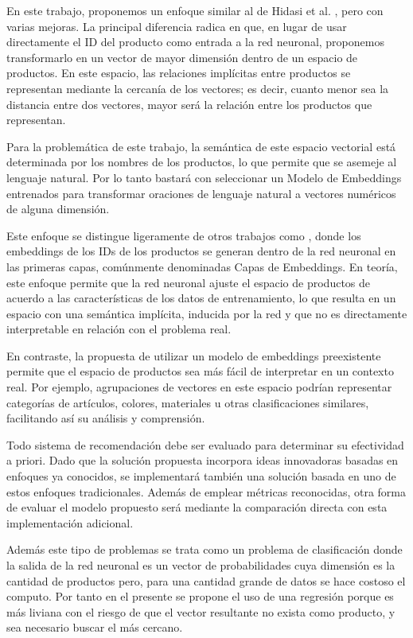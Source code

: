 \documentclass[runningheads]{llncs}
\begin{document}
En este trabajo, proponemos un enfoque similar al de Hidasi et al. \cite{hidasi2016session}, pero con varias mejoras. La principal diferencia radica en que, en lugar de usar directamente el ID del producto como entrada a la red neuronal, proponemos transformarlo en un vector de mayor dimensión dentro de un espacio de productos. En este espacio, las relaciones implícitas entre productos se representan mediante la cercanía de los vectores; es decir, cuanto menor sea la distancia entre dos vectores, mayor será la relación entre los productos que representan.

Para la problemática de este trabajo, la semántica de este espacio vectorial está determinada por los nombres de los productos, lo que permite que se asemeje al lenguaje natural. Por lo tanto bastará con seleccionar un Modelo de Embeddings entrenados para transformar oraciones de lenguaje natural a vectores numéricos de alguna dimensión.

Este enfoque se distingue ligeramente de otros trabajos como \cite{chung2014empirical,tang2018personalized}, donde los embeddings de los IDs de los productos se generan dentro de la red neuronal en las primeras capas, comúnmente denominadas Capas de Embeddings. En teoría, este enfoque permite que la red neuronal ajuste el espacio de productos de acuerdo a las características de los datos de entrenamiento, lo que resulta en un espacio con una semántica implícita, inducida por la red y que no es directamente interpretable en relación con el problema real.

En contraste, la propuesta de utilizar un modelo de embeddings preexistente permite que el espacio de productos sea más fácil de interpretar en un contexto real. Por ejemplo, agrupaciones de vectores en este espacio podrían representar categorías de artículos, colores, materiales u otras clasificaciones similares, facilitando así su análisis y comprensión.

Todo sistema de recomendación debe ser evaluado para determinar su efectividad a priori. Dado que la solución propuesta incorpora ideas innovadoras basadas en enfoques ya conocidos, se implementará también una solución basada en uno de estos enfoques tradicionales. Además de emplear métricas reconocidas, otra forma de evaluar el modelo propuesto será mediante la comparación directa con esta implementación adicional.

Además este tipo de problemas se trata como un problema de clasificación donde la salida de la red neuronal es un vector de probabilidades cuya dimensión es la cantidad de productos pero, para una cantidad grande de datos se hace costoso el computo. Por tanto en el presente se propone el uso de una regresión porque es más liviana con el riesgo de que el vector resultante no exista como producto, y sea necesario buscar el más cercano.
\end{document}
